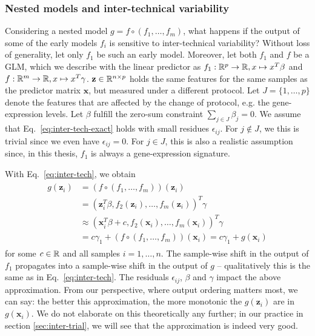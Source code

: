 \subsubsection{Nested models and inter-technical variability}

Considering a nested model $g = f \circ (f_1, \ldots, f_m)$, what happens if the output of some of 
the early models $f_i$ is sensitive to inter-technical variability? Without loss of generality, let 
only $f_1$ be such an early model. Moreover, let both $f_1$ and $f$ be a GLM, which we describe 
with the linear predictor as $f_1: \mathbb{R}^p \to \mathbb{R}, x \mapsto x^T \beta$ and $f: \mathbb{R}^m \to \mathbb{R}, 
x \mapsto x^T \gamma$. 
$\mathbf{z} \in \mathbb{R}^{n \times p}$ holds the same features for the same samples as the 
predictor matrix $\mathbf{x}$, but measured under a different protocol. Let $J = \{1, \ldots, p\}$ 
denote the features that are affected by the change of protocol, e.g. the gene-expression levels.
Let $\beta$ fulfill the zero-sum constraint $\sum_{j \in J} \beta_j = 0$.
We assume that Eq.\ \eqref{eq:inter-tech-exact} holds with small residues $\epsilon_{ij}$. For $j 
\notin J$, we this is trivial since we even have $\epsilon_{ij} = 0$. For $j \in J$, this is also 
a realistic assumption since, in this thesis, $f_1$ is always a gene-expression signature.

With Eq.\ \eqref{eq:inter-tech}, we obtain
\begin{align}\label{eq:inter-tech-nested}
\begin{split}
    g(\mathbf{z}_i) &= (f \circ (f_1, \ldots, f_m))(\mathbf{z}_i) \\ 
    &= (\mathbf{z}_i^T \beta, f_2(\mathbf{z}_i), \ldots, f_m(\mathbf{z}_i))^T \gamma \\
    &\approx (\mathbf{x}_i^T \beta + c, f_2(\mathbf{x}_i), \ldots, f_m(\mathbf{x}_i))^T \gamma \\ 
    &= c \gamma_1 + (f \circ (f_1, \ldots, f_m))(\mathbf{x}_i) = c \gamma_1 + g(\mathbf{x}_i)
\end{split}
\end{align}
for some $c \in \mathbb{R}$ and all samples $i = 1, \ldots, n$. The sample-wise shift in the output of 
$f_1$ propagates into a sample-wise shift in the output of $g$ -- qualitatively this is the same 
as in Eq.\ \ref{eq:inter-tech}. The residuals $\epsilon_{ij}$, $\beta$ and $\gamma$ impact the 
above approximation. From our 
perspective, where output ordering matters most, we can say: the better this approximation, the more 
monotonic the $g(\mathbf{z}_i)$ are in $g(\mathbf{x}_i)$. We do not elaborate on this theoretically any further; 
in our practice in section \ref{sec:inter-trial}, we will see that the approximation is indeed
very good.

